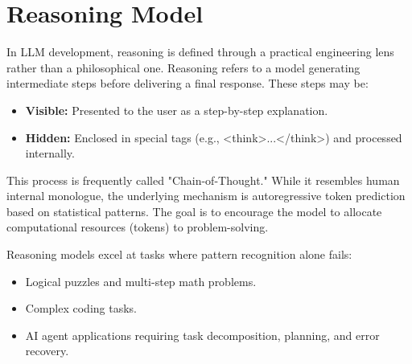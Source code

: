 \section{Reasoning Model}
\label{sec:reasoning-model}


In LLM development, reasoning is defined through a practical engineering lens rather than a philosophical one. Reasoning refers to a model generating intermediate steps before delivering a final response. These steps may be:

\begin{itemize}
    \item \textbf{Visible:} Presented to the user as a step-by-step explanation.
    \item \textbf{Hidden:} Enclosed in special tags (e.g., <think>...</think>) and processed internally.
\end{itemize}

This process is frequently called "Chain-of-Thought." While it resembles human internal monologue, the underlying mechanism is autoregressive token prediction based on statistical patterns. The goal is to encourage the model to allocate computational resources (tokens) to problem-solving.

Reasoning models excel at tasks where pattern recognition alone fails:

\begin{itemize}
    \item Logical puzzles and multi-step math problems.
    \item Complex coding tasks.
    \item AI agent applications requiring task decomposition, planning, and error recovery.
\end{itemize}


